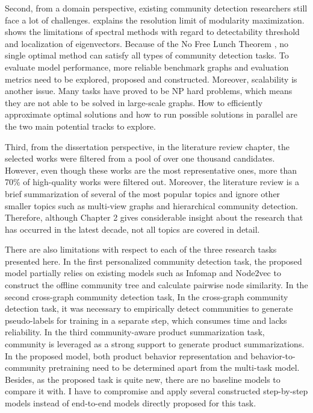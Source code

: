 Second, from a domain perspective, existing community detection researchers still face a lot of challenges. \cite{lancichinetti2011limits,xiang2012multi,xiang2012limitation} explains the resolution limit of modularity maximization.  \cite{kawamoto2015limitations} shows the limitations of spectral methods  with regard to detectability threshold and localization of eigenvectors. Because of the No Free Lunch Theorem \cite{wolpert1997no}, no single optimal method can satisfy all types of community detection tasks. To evaluate model performance, more reliable benchmark graphs and evaluation metrics need to be explored, proposed and constructed. Moreover, scalability is another issue. Many tasks have proved to be NP hard problems, which means they are not able to be solved in large-scale graphs. How to efficiently approximate optimal solutions and how to run possible solutions in parallel are the two main potential tracks to explore.

Third, from the dissertation perspective, in the literature review chapter, the selected works were filtered from a pool of over one thousand candidates. However, even though these works are the most representative ones, more than 70\% of high-quality works were filtered out. Moreover, the literature review is a brief summarization of several of the most popular topics and ignore other smaller topics such as multi-view graphs and hierarchical community detection. Therefore, although Chapter 2 gives considerable insight about the research that has occurred in the latest decade, not all topics are covered in detail.

There are also limitations with respect to each of the three research tasks presented here. In the first personalized community detection task,  the proposed model partially relies on existing models such as Infomap and Node2vec to construct the offline community tree and calculate pairwise node similarity. In the second cross-graph community detection task, In the cross-graph community detection task, it was necessary to empirically detect communities to generate pseudo-labels for training in a separate step,  which consumes time and lacks reliability. In the third community-aware product summarization task, community is leveraged as a strong support to generate product summarizations. In the proposed model, both product behavior representation and behavior-to-community pretraining need to be determined apart from the multi-task model. Besides, as the proposed task is quite new, there are no baseline models to compare it with. I have to compromise and apply several constructed step-by-step models instead of end-to-end models directly proposed for this task. 
